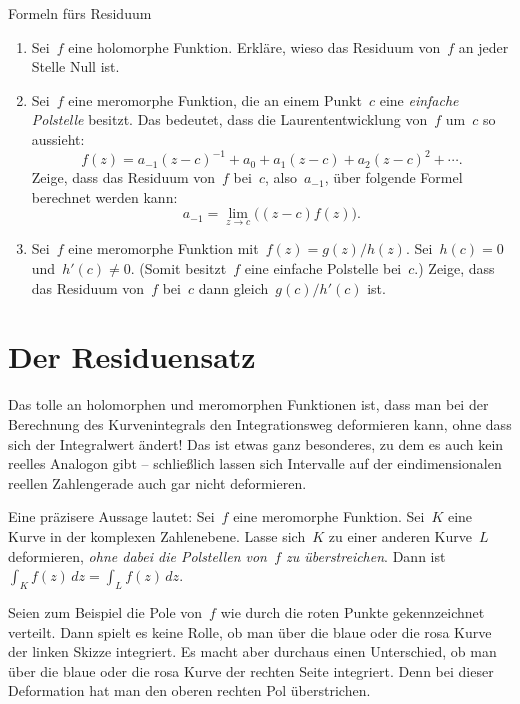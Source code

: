 \documentclass[twoside]{../zirkelblatt1415}
\theoremstyle{definition}
\theoremstyle{plain}
\theoremstyle{remark}
\begin{document}
\begin{aufgabe}{Formeln fürs Residuum}\label{aufg:residuum-formeln}
\begin{enumerate}
\item Sei~$f$ eine holomorphe Funktion. Erkläre, wieso das Residuum von~$f$ an
jeder Stelle Null ist.
\item Sei~$f$ eine meromorphe Funktion, die an einem Punkt~$c$ eine
\emph{einfache Polstelle} besitzt. Das bedeutet, dass die Laurententwicklung
von~$f$ um~$c$ so aussieht:
\[ f(z) = a_{-1} (z-c)^{-1} + a_0 + a_1 (z-c) + a_2 (z-c)^2 + \cdots. \]
Zeige, dass das Residuum von~$f$ bei~$c$, also~$a_{-1}$, über folgende Formel
berechnet werden kann:
\[ a_{-1} = \lim_{z \to c} \bigl((z-c) f(z)\bigr). \]
\item Sei~$f$ eine meromorphe Funktion mit~$f(z) = g(z) / h(z)$. Sei~$h(c) = 0$
und~$h'(c) \neq 0$. (Somit besitzt~$f$ eine einfache Polstelle bei~$c$.) Zeige,
dass das Residuum von~$f$ bei~$c$ dann gleich~$g(c) / h'(c)$ ist.
\end{enumerate}\fixlistspacing
\end{aufgabe}


\section{Der Residuensatz}

Das tolle an holomorphen und meromorphen Funktionen ist, dass man bei der
Berechnung des Kurvenintegrals den Integrationsweg deformieren kann, ohne dass
sich der Integralwert ändert! Das ist etwas ganz besonderes, zu dem es auch
kein reelles Analogon gibt -- schließlich lassen sich Intervalle auf der
eindimensionalen reellen Zahlengerade auch gar nicht deformieren.

Eine präzisere Aussage lautet: Sei~$f$ eine meromorphe Funktion. Sei~$K$ eine
Kurve in der komplexen Zahlenebene. Lasse sich~$K$ zu einer anderen Kurve~$L$
deformieren, \emph{ohne dabei die Polstellen von~$f$ zu überstreichen}. Dann
ist~$\int_K f(z) \,dz = \int_L f(z) \,dz$.

Seien zum Beispiel die Pole von~$f$ wie durch die roten Punkte gekennzeichnet
verteilt. Dann spielt es keine Rolle, ob man über die blaue oder die rosa Kurve
der linken Skizze integriert. Es macht aber durchaus einen Unterschied, ob man
über die blaue oder die rosa Kurve der rechten Seite integriert. Denn bei
dieser Deformation hat man den oberen rechten Pol überstrichen.
\end{document}
